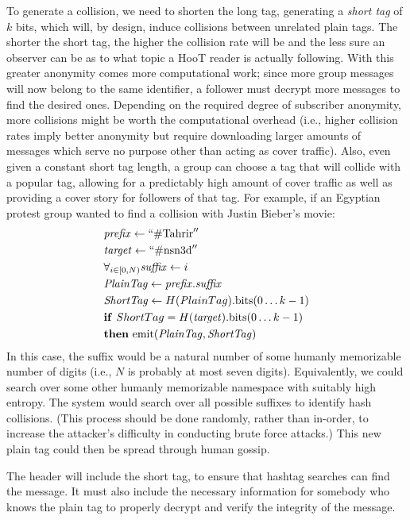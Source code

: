To generate a collision, we need to shorten the long tag, generating a \textit{short tag} of $k$ bits, which will, by design, induce collisions between unrelated plain tags. The shorter the short tag, the higher the collision rate will be and the less sure an observer can be as to what topic a HooT reader is actually following. With this greater anonymity comes more computational work; since more group messages will now belong to the same identifier, a follower must decrypt more messages to find the desired ones. Depending on the required degree of subscriber anonymity, more collisions might be worth the computational overhead (i.e., higher collision rates imply better anonymity but require downloading larger amounts of messages which serve no purpose other than acting as cover traffic). Also, even given a constant short tag length, a group can choose a tag that will collide with a popular tag, allowing for a predictably high amount of cover traffic as well as providing a cover story for followers of that tag. For example, if an Egyptian protest group wanted to find a collision with Justin Bieber's movie:
%
\begin{align*}
& \mathit{prefix} \leftarrow  ``\mathrm{\#Tahrir}'' \\
& \mathit{target} \leftarrow ``\mathrm{\#nsn3d}'' \\
& \forall_{i \in [0, N)}  \mathit{suffix} \leftarrow i \\
& \mathit{PlainTag} \leftarrow  \mathit{prefix}.\mathit{suffix} \\
& \mathit{ShortTag} \leftarrow H({\mathit PlainTag}).\mathrm{bits}(0 \ldots k-1) \\
& \mathbf{if}\ {\mathit ShortTag} = H(\mathit{target}).\mathrm{bits}(0 \ldots k-1)\\
& \mathbf{then}\ \mathrm{emit} (\mathit{PlainTag} , {\mathit{ShortTag}}) 
\end{align*}
%
In this case, the suffix would be a natural number of some humanly memorizable number of digits (i.e., $N$ is probably at most seven digits). Equivalently, we could search over some other humanly memorizable namespace with suitably high entropy. The system would search over all possible suffixes to identify hash collisions. (This process should be done randomly, rather than in-order, to increase the attacker's difficulty in conducting brute force attacks.) This new plain tag could then be spread through human gossip.

The header will include the short tag, to ensure that hashtag searches can find the message. It must also include the necessary information for somebody who knows the plain tag to properly decrypt and verify the integrity of the message. 

